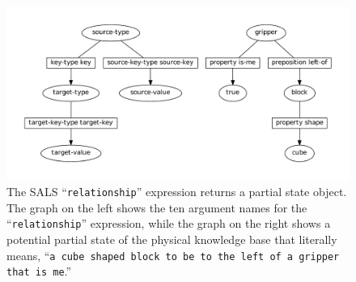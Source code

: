 \begin{figure}
\centering
\includegraphics[width=12cm]{gfx/relationship_partial_state_graph}
\caption[The SALS ``{\tt{relationship}}'' expression returns a partial
  state object.]{The SALS ``{\tt{relationship}}'' expression returns a
  partial state object.  The graph on the left shows the ten argument
  names for the ``{\tt{relationship}}'' expression, while the graph on
  the right shows a potential partial state of the physical knowledge
  base that literally means, ``{\tt{a cube shaped block to be to the
      left of a gripper that is me}}.''}
\label{figure:relationship_partial_state_graph}
\end{figure}

